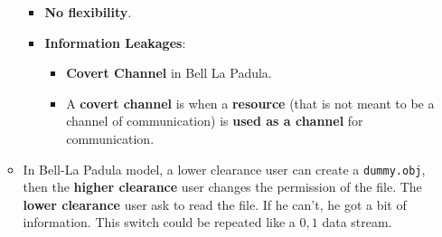 \documentclass[9pt, letterpaper]{article}
\begin{document}
\begin{itemize}
\begin{itemize}
		            \begin{itemize}
			            \item \textbf{No flexibility}.
			            \item \textbf{Information Leakages}:
			                  \begin{itemize}
				                  \item \textbf{Covert Channel} in Bell La Padula.
				                  \item A \textbf{covert channel} is when a \textbf{resource} (that is not meant to be a channel of communication) is \textbf{used as a channel} for communication.
			                  \end{itemize}
		            \end{itemize}
		      \item In Bell-La Padula model, a lower clearance user can create a {\tt dummy.obj}, then the \textbf{higher clearance} user changes the permission of the file. The \textbf{lower clearance} user ask to read the file. If he can't, he got a bit of information. This switch could be repeated like a $0,1$ data stream.
	      \end{itemize}
\end{itemize}
\end{document}
